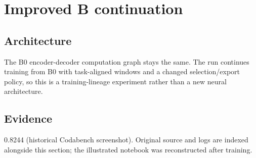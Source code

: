 \section{Improved B continuation}
\subsection{Architecture} The B0 encoder-decoder computation graph stays the same. The run continues training from B0 with task-aligned windows and a changed selection/export policy, so this is a training-lineage experiment rather than a new neural architecture.
\subsection{Evidence} 0.8244 (historical Codabench screenshot). Original source and logs are indexed alongside this section; the illustrated notebook was reconstructed after training.
